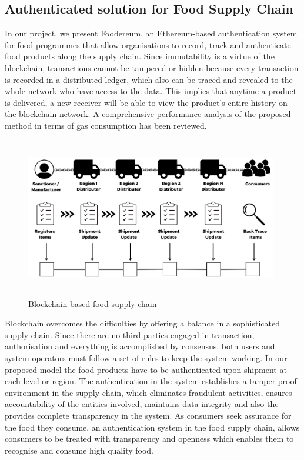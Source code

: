 \documentclass[12pt,a4paper,twocolumn,fleqn]{article}
\begin{document}
\subsection{Authenticated solution for Food Supply Chain}
In our project, we present Foodereum, an Ethereum-based authentication system for food programmes that allow organisations to record, track and authenticate food products along the supply chain. Since immutability is a virtue of the blockchain, transactions cannot be tampered or hidden because every transaction is recorded in a distributed ledger, which also can be traced and revealed to the whole network who have access to the data. This implies that anytime a product is delivered, a new receiver will be able to view the product's entire history on the blockchain network. A comprehensive performance analysis of the proposed method in terms of gas consumption has been reviewed.
\begin{figure} [H]
\includegraphics[width=11cm,height=7cm]{media/Sanctioner.png}
\centering
\caption{Blockchain-based food supply chain}
\end{figure}
Blockchain overcomes the difficulties by offering a balance in a sophisticated supply chain. Since there are no third parties engaged in transaction, authorisation and everything is accomplished by consensus, both users and system operators must follow a set of rules to keep the system working. In our proposed model the food products have to be authenticated upon shipment at each level or region. The authentication in the system establishes a tamper-proof environment in the supply chain, which eliminates fraudulent activities, ensures accountability of the entities involved, maintains data integrity and also the provides complete transparency in the system. As consumers seek assurance for the food they consume, an authentication system in the food supply chain, allows consumers to be treated with transparency and openness which enables them to recognise and consume high quality food. 
\end{document}
